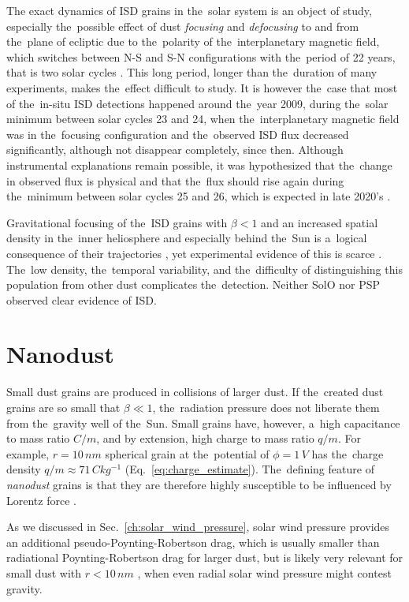 The exact dynamics of ISD grains in the~solar system is an object of study, especially the~possible effect of dust \textit{focusing} and \textit{defocusing} to and from the~plane of ecliptic due to the~polarity of the~interplanetary magnetic field, which switches between N-S and S-N configurations with the~period of 22 years, that is two solar cycles \citep{morfill1979motion}. This long period, longer than the~duration of many experiments, makes the~effect difficult to study. It is however the~case that most of the~in-situ ISD detections happened around the~year 2009, during the~solar minimum between solar cycles 23 and 24, when the~interplanetary magnetic field was in the~focusing configuration \citep{babic2022situ} and the~observed ISD flux decreased significantly, although not disappear completely, since then. Although instrumental explanations remain possible, it was hypothesized that the~change in observed flux is physical and that the~flux should rise again during the~minimum between solar cycles 25 and 26, which is expected in late 2020's \citep{mann2010interstellar}. 

Gravitational focusing of the~ISD grains with $\beta < 1$ and an increased spatial density in the~inner heliosphere and especially behind the~Sun is a~logical consequence of their trajectories \citep{mann2010interstellar}, yet experimental evidence of this is scarce \citep{altobelli2006new}. The~low density, the~temporal variability, and the~difficulty of distinguishing this population from other dust complicates the~detection. Neither SolO nor PSP observed clear evidence of ISD.

\section{Nanodust}

Small dust grains are produced in collisions of larger dust. If the~created dust grains are so small that $\beta \ll 1$, the~radiation pressure does not liberate them from the~gravity well of the~Sun. Small grains have, however, a~high capacitance to mass ratio $C/m$, and by extension, high charge to mass ratio $q/m$. For example, $r = 10 \, \si{nm}$ spherical grain at the~potential of $\phi = 1 \, \si{V}$ has the~charge density $q/m \approx 71 \, \si{Ckg^{-1}}$ (Eq.~\ref{eq:charge_estimate}). The~defining feature of \textit{nanodust} grains is that they are therefore highly susceptible to be influenced by Lorentz force \citep{czechowski2010formation}. 

As we discussed in Sec.~\ref{ch:solar_wind_pressure}, solar wind pressure provides an additional pseudo-Poynting-Robertson drag, which is usually smaller than radiational Poynting-Robertson drag for larger dust, but is likely very relevant for small dust with $r<10\, \si{nm}$ \citep{mukai1982solar}, when even radial solar wind pressure might contest gravity. 

